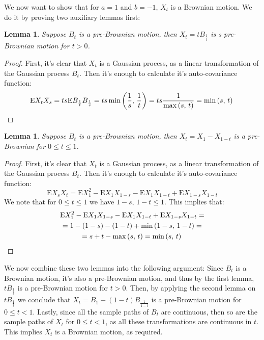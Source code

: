 \documentclass{amsart}
\theoremstyle{plain}
\newtheorem{lemma}[theorem]{Lemma}
\theoremstyle{definition}
\theoremstyle{definition}
\theoremstyle{remark}
\begin{document}
We now want to show that for \(a=1\) and \(b=-1\), \(X_{t}\) is a Brownian motion. We do it by proving two auxiliary lemmas first:
\begin{lemma}
    Suppose \(B_{t}\) is a pre-Brownian motion, then \(X_{t}=tB_{\frac{1}{t}}\) is s pre-Brownian motion for \(t>0\).
\end{lemma}
\begin{proof}
   First, it's clear that \(X_{t}\) is a Gaussian process, as a linear transformation of the Gaussian process \(B_{t}\). Then it's enough to calculate it's auto-covariance function:
   \begin{equation*}
       \mathrm{E}X_{t}X_{s} = ts \mathrm{E}B_{\frac{1}{t}}B_{\frac{1}{s}}=ts \min\left( \frac{1}{s},\,\frac{1}{t} \right) = ts \frac{1}{\max \left(s,\,t\right)} = \min \left(s,\,t\right)
       \qedhere
   \end{equation*}
\end{proof}
\begin{lemma}
    Suppose \(B_{t}\) is a pre-Brownian motion, then \(X_{t} = X_{1} - X_{1-t}\) is a pre-Brownian for \(0\leq t \leq 1\).
\end{lemma}
\begin{proof}
   First, it's clear that \(X_{t}\) is a Gaussian process, as a linear transformation of the Gaussian process \(B_{t}\). Then it's enough to calculate it's auto-covariance function:
   \begin{equation*}
       \mathrm{E}X_{s}X_{t} = \mathrm{E}X_{1}^{2} -\mathrm{E}X_{1}X_{1-s} - \mathrm{E}X_{1}X_{1-t} + \mathrm{E}X_{1-s}X_{1-t}
   \end{equation*}
   We note that for \(0\leq t\leq 1\) we have \(1-s,\,1-t \leq 1\). This implies that:
  \begin{gather*}
      \mathrm{E}X_{1}^{2} -\mathrm{E}X_{1}X_{1-s} - \mathrm{E}X_{1}X_{1-t} + \mathrm{E}X_{1-s}X_{1-t} = \\ = 1 - \left(1-s\right) - \left(1-t\right) + \min \left(1-s,\,1-t\right) = \\ =  s + t - \max \left(s,\,t\right) = \min \left(s,\,t\right)
      \qedhere
  \end{gather*}
\end{proof}

We now combine these two lemmas into the following argument: Since \(B_{t}\) is a Brownian motion, it's also a pre-Brownian motion, and thus by the first lemma, \(tB_{\frac{1}{t}}\) is a pre-Brownian motion for \(t > 0\). Then, by applying the second lemma on \(tB_{\frac{1}{t}}\) we conclude that \(X_{t} = B_{1}-\left(1-t\right)B_{\frac{1}{1-t}}\) is a pre-Brownian motion for \(0 \leq t < 1\). Lastly, since all the sample paths of \(B_{t}\) are continuous,
then so are the sample paths of \(X_{t}\) for \(0 \leq t < 1\), as all these transformations are continuous in \(t\). This implies \(X_{t}\) is a Brownian motion, as required.
\end{document}
